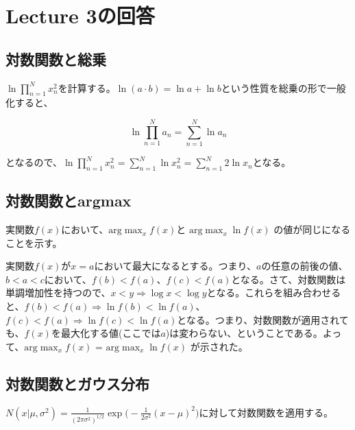 \section*{Lecture 3の回答}

\subsection*{対数関数と総乗}

$\ln \prod_{n=1}^N x_n^2 $を計算する。$\ln (a \cdot b) = \ln a + \ln b$という性質を総乗の形で一般化すると、

\begin{equation*}
	\ln \prod_{n=1}^N a_n = \sum_{n=1}^N \ln a_n
\end{equation*}

となるので、$\ln \prod_{n=1}^N x_n^2 = \sum_{n=1}^N \ln x_n^2 = \sum_{n=1}^N  2\ln x_n $となる。


\subsection*{対数関数とargmax}

実関数$f(x)$において、$\mathrm{arg}\!\max_{x} f(x) $と $\mathrm{arg}\!\max_{x} \ln f(x) $ の値が同じになることを示す。

実関数$f(x)$が$x=a$において最大になるとする。つまり、$a$の任意の前後の値、$b<a<c$において、$f(b) < f(a)$、$f(c) < f(a)$となる。さて、対数関数は単調増加性を持つので、$x < y \Rightarrow \log x < \log y$となる。これらを組み合わせると、$f(b) < f(a) \Rightarrow \ln f(b) < \ln f(a)$、$f(c) < f(a) \Rightarrow \ln f(c) < \ln f(a)$となる。つまり、対数関数が適用されても、$f(x)$を最大化する値(ここでは$a$)は変わらない、ということである。よって、$\mathrm{arg}\!\max_{x} f(x) $ = $\mathrm{arg}\!\max_{x} \ln f(x) $ が示された。

\subsection*{対数関数とガウス分布}

$N(x | \mu , \sigma^2 ) = \frac{1}{(2\pi \sigma^2)^{1/2}} \exp \bigg( -\frac{1}{2\sigma^2}(x-\mu)^2 \bigg)$に対して対数関数を適用する。

